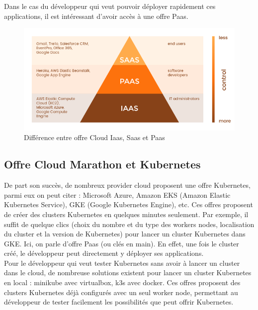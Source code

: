 \documentclass[11pt,fleqn]{book} %
\begin{document}
Dans le cas du développeur qui veut pouvoir déployer rapidement ces applications, il est intéressant d'avoir accès à une offre Paas.
\newpage
\begin{figure}[H]\centering
\renewcommand{\figurename}{Schéma}
\includegraphics[clip,trim={0cm, 0cm, 0cm, 1cm}, scale=0.6]{Pictures/Comparaison/cloud/difference-cloud.png}
\captionsetup{margin=1.5cm,format=hang,justification=justified}
\caption[]{Différence entre offre Cloud Iaas, Saas et Paas \newline}
\end{figure}

\vspace{-1cm}
\subsection*{Offre Cloud Marathon et Kubernetes}
De part son succès, de nombreux provider cloud proposent une offre Kubernetes, parmi eux on peut citer : Microsoft Azure, Amazon EKS (Amazon Elastic Kubernetes Service), GKE (Google Kubernetes Engine), etc. Ces offres proposent de créer des clusters Kubernetes en quelques minutes seulement. Par exemple, il suffit de quelque clics (choix du nombre et du type des workers nodes, localisation du cluster et la version de Kubernetes) pour lancer un cluster Kubernetes dans GKE. Ici, on parle d'offre Paas (ou clés en main). En effet, une fois le cluster créé, le développeur peut directement y déployer ses applications.\\

Pour le développeur qui veut tester Kubernetes sans avoir à lancer un cluster dans le cloud, de nombreuse solutions existent pour lancer un cluster Kubernetes en local : minikube avec virtualbox, k3s avec docker. Ces offres proposent des clusters Kubernetes déjà configurés avec un seul worker node, permettant au développeur de tester facilement les possibilités que peut offrir Kubernetes.\\
\end{document}
